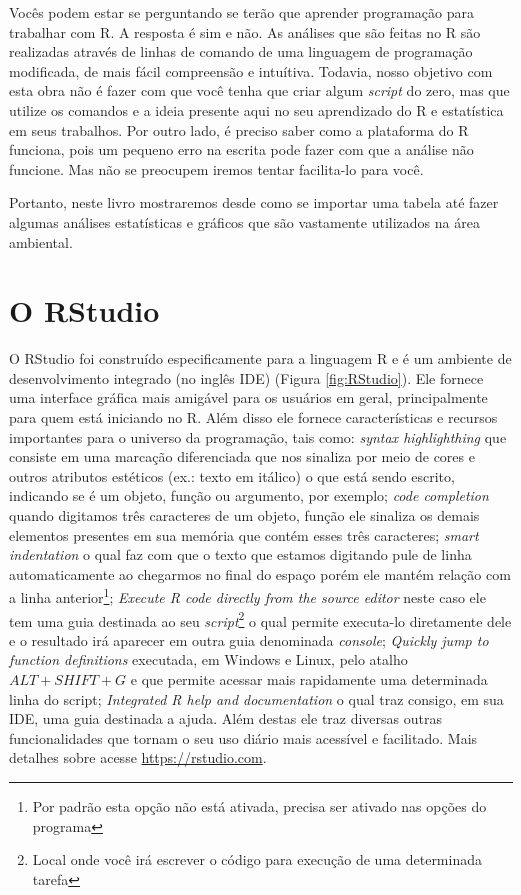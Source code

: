 \documentclass[14pt,titlepage, oneside, openany, a4paper]{book}
\begin{document}
Vocês podem estar se perguntando se terão que aprender programação para trabalhar com R. A resposta é sim e não. As análises que são feitas no R são realizadas através de linhas de comando de uma linguagem de programação modificada, de mais fácil compreensão e intuítiva. Todavia, nosso objetivo com esta obra não é fazer com que você tenha que criar algum \emph{script} do zero, mas que utilize os comandos e a ideia presente aqui no seu aprendizado do R e estatística em seus trabalhos. Por outro lado, é preciso saber como a plataforma do R funciona, pois um pequeno erro na escrita pode fazer com que a análise não funcione. Mas não se preocupem iremos tentar facilita-lo para você.

Portanto, neste livro mostraremos desde como se importar uma tabela até fazer algumas análises estatísticas e gráficos que são vastamente utilizados na área ambiental.

\hypertarget{o-rstudio}{%
\section{O RStudio}\label{o-rstudio}}

O RStudio foi construído especificamente para a linguagem R e é um ambiente de desenvolvimento integrado (no inglês IDE) (Figura \ref{fig:RStudio}). Ele fornece uma interface gráfica mais amigável para os usuários em geral, principalmente para quem está iniciando no R. Além disso ele fornece características e recursos importantes para o universo da programação, tais como: \emph{syntax highlighthing} que consiste em uma marcação diferenciada que nos sinaliza por meio de cores e outros atributos estéticos (ex.: texto em itálico) o que está sendo escrito, indicando se é um objeto, função ou argumento, por exemplo; \emph{code completion} quando digitamos três caracteres de um objeto, função ele sinaliza os demais elementos presentes em sua memória que contém esses três caracteres; \emph{smart indentation} o qual faz com que o texto que estamos digitando pule de linha automaticamente ao chegarmos no final do espaço porém ele mantém relação com a linha anterior\footnote{Por padrão esta opção não está ativada, precisa ser ativado nas opções do programa}; \emph{Execute R code directly from the source editor} neste caso ele tem uma guia destinada ao seu \emph{script}\footnote{Local onde você irá escrever o código para execução de uma determinada tarefa} o qual permite executa-lo diretamente dele e o resultado irá aparecer em outra guia denominada \emph{console}; \emph{Quickly jump to function definitions} executada, em Windows e Linux, pelo atalho \(ALT + SHIFT + G\) e que permite acessar mais rapidamente uma determinada linha do script; \emph{Integrated R help and documentation} o qual traz consigo, em sua IDE, uma guia destinada a ajuda. Além destas ele traz diversas outras funcionalidades que tornam o seu uso diário mais acessível e facilitado. Mais detalhes sobre acesse \url{https://rstudio.com}.
\end{document}
